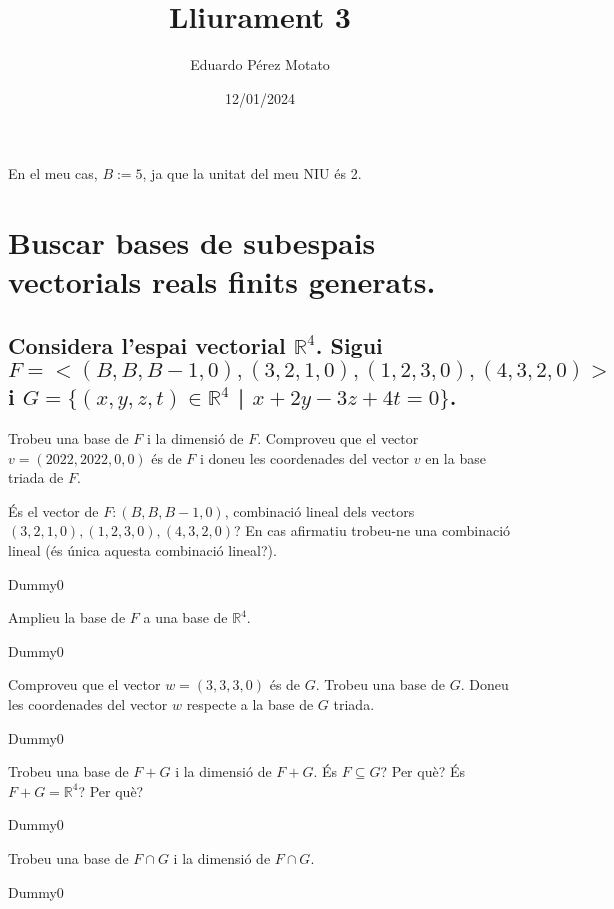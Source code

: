\documentclass[a4paper, 12pt]{article}
\title{Lliurament 3}
\author{Eduardo Pérez Motato}
\date{12/01/2024}
\begin{document}
    \makeheader
    \begin{center}
        En el meu cas, $B := 5$, ja que la unitat del meu NIU és 2.
    \end{center}
    \section{Buscar bases de subespais vectorials reals finits generats.}
    \subsection{Considera l'espai vectorial $\mathbb{R}^4$. Sigui $F=<(B, B, B-1, 0), (3, 2, 1, 0), (1, 2, 3, 0), (4, 3, 2, 0)>$
    i $G = \{(x, y, z, t) \in \mathbb{R}^4$ | $x + 2y - 3z + 4t = 0\}$.}
    \begin{exercici}
        Trobeu una base de $F$ i la dimensió de $F$. Comproveu que el vector $v = (2022, 2022, 0, 0)$
        és de $F$ i doneu les coordenades del vector $v$ en la base triada de $F$.
    \end{exercici}
    \begin{solucio}
        \lipsum[1-10]
    \end{solucio}
    \begin{exercici}
        És el vector de $F: (B, B, B-1, 0)$, combinació lineal dels vectors $(3, 2, 1, 0), (1, 2, 3, 0), (4, 3, 2, 0)$?
        En cas afirmatiu trobeu-ne una combinació lineal (és única aquesta combinació lineal?).
    \end{exercici}
    \begin{solucio}
        Dummy0
    \end{solucio}
    \begin{exercici}
        Amplieu la base de $F$ a una base de $\mathbb{R}^4$.
    \end{exercici}
    \begin{solucio}
        Dummy0
    \end{solucio}
    \begin{exercici}
        Comproveu que el vector $w = (3, 3, 3, 0)$ és de $G$. Trobeu una base de $G$. Doneu les
        coordenades del vector $w$ respecte a la base de $G$ triada.
    \end{exercici}
    \begin{solucio}
        Dummy0
    \end{solucio}
    \begin{exercici}
        Trobeu una base de $F+G$ i la dimensió de $F+G$. És $F \subseteq G$? Per què? És $F+G = \mathbb{R}^4$?
        Per què?
    \end{exercici}
    \begin{solucio}
        Dummy0
    \end{solucio}
    \begin{exercici}
        Trobeu una base de $F \cap G$ i la dimensió de $F \cap G$.
    \end{exercici}
    \begin{solucio}
        Dummy0
    \end{solucio}
\end{document}
